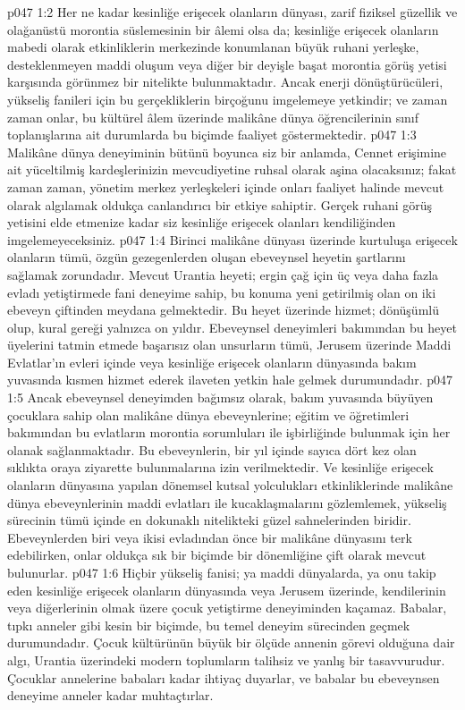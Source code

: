 \vs p047 1:2 Her ne kadar kesinliğe erişecek olanların dünyası, zarif fiziksel güzellik ve olağanüstü morontia süslemesinin bir âlemi olsa da; kesinliğe erişecek olanların mabedi olarak etkinliklerin merkezinde konumlanan büyük ruhani yerleşke, desteklenmeyen maddi oluşum veya diğer bir deyişle başat morontia görüş yetisi karşısında görünmez bir nitelikte bulunmaktadır. Ancak enerji dönüştürücüleri, yükseliş fanileri için bu gerçekliklerin birçoğunu imgelemeye yetkindir; ve zaman zaman onlar, bu kültürel âlem üzerinde malikâne dünya öğrencilerinin sınıf toplanışlarına ait durumlarda bu biçimde faaliyet göstermektedir.
\vs p047 1:3 Malikâne dünya deneyiminin bütünü boyunca siz bir anlamda, Cennet erişimine ait yüceltilmiş kardeşlerinizin mevcudiyetine ruhsal olarak aşina olacaksınız; fakat zaman zaman, yönetim merkez yerleşkeleri içinde onları faaliyet halinde mevcut olarak algılamak oldukça canlandırıcı bir etkiye sahiptir. Gerçek ruhani görüş yetisini elde etmenize kadar siz kesinliğe erişecek olanları kendiliğinden imgelemeyeceksiniz.
\vs p047 1:4 Birinci malikâne dünyası üzerinde kurtuluşa erişecek olanların tümü, özgün gezegenlerden oluşan ebeveynsel heyetin şartlarını sağlamak zorundadır. Mevcut Urantia heyeti; ergin çağ için üç veya daha fazla evladı yetiştirmede fani deneyime sahip, bu konuma yeni getirilmiş olan on iki ebeveyn çiftinden meydana gelmektedir. Bu heyet üzerinde hizmet; dönüşümlü olup, kural gereği yalnızca on yıldır. Ebeveynsel deneyimleri bakımından bu heyet üyelerini tatmin etmede başarısız olan unsurların tümü, Jerusem üzerinde Maddi Evlatlar’ın evleri içinde veya kesinliğe erişecek olanların dünyasında bakım yuvasında kısmen hizmet ederek ilaveten yetkin hale gelmek durumundadır.
\vs p047 1:5 Ancak ebeveynsel deneyimden bağımsız olarak, bakım yuvasında büyüyen çocuklara sahip olan malikâne dünya ebeveynlerine; eğitim ve öğretimleri bakımından bu evlatların morontia sorumluları ile işbirliğinde bulunmak için her olanak sağlanmaktadır. Bu ebeveynlerin, bir yıl içinde sayıca dört kez olan sıklıkta oraya ziyarette bulunmalarına izin verilmektedir. Ve kesinliğe erişecek olanların dünyasına yapılan dönemsel kutsal yolculukları etkinliklerinde malikâne dünya ebeveynlerinin maddi evlatları ile kucaklaşmalarını gözlemlemek, yükseliş sürecinin tümü içinde en dokunaklı nitelikteki güzel sahnelerinden biridir. Ebeveynlerden biri veya ikisi evladından önce bir malikâne dünyasını terk edebilirken, onlar oldukça sık bir biçimde bir dönemliğine çift olarak mevcut bulunurlar.
\vs p047 1:6 Hiçbir yükseliş fanisi; ya maddi dünyalarda, ya onu takip eden kesinliğe erişecek olanların dünyasında veya Jerusem üzerinde, kendilerinin veya diğerlerinin olmak üzere çocuk yetiştirme deneyiminden kaçamaz. Babalar, tıpkı anneler gibi kesin bir biçimde, bu temel deneyim sürecinden geçmek durumundadır. Çocuk kültürünün büyük bir ölçüde annenin görevi olduğuna dair algı, Urantia üzerindeki modern toplumların talihsiz ve yanlış bir tasavvurudur. Çocuklar annelerine babaları kadar ihtiyaç duyarlar, ve babalar bu ebeveynsen deneyime anneler kadar muhtaçtırlar.
